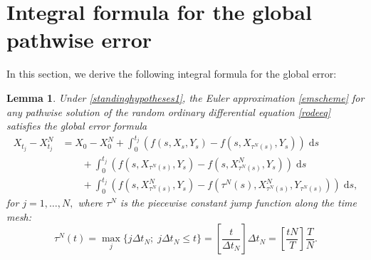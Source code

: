 \documentclass[reqno,12pt]{amsart}
\theoremstyle{plain} %
\newtheorem{lemma}{Lemma}[section]
\theoremstyle{definition} %
\begin{document}
\section{Integral formula for the global pathwise error}

In this section, we derive the following integral formula for the global error:
\begin{lemma}
    \label{lemglobalerrorintegralformula}
    Under \cref{standinghypotheses1}, the Euler approximation \eqref{emscheme} for any pathwise solution of the random ordinary differential equation \eqref{rodeeq} satisfies the global error formula
    \begin{equation}
        \label{globalerrorintegralformula}
        \begin{aligned}
            X_{t_j} - X_{t_j}^N & = X_0 - X_0^N + \int_0^{t_j} \left( f(s, X_s, Y_s) - f(s, X_{\tau^N(s)}, Y_s) \right)\;\mathrm{d}s  \\ 
            & \qquad + \int_{0}^{t_j} \left( f(s, X_{\tau^N(s)}, Y_s) - f(s, X_{\tau^N(s)}^N, Y_s) \right)\;\mathrm{d}s \\
            & \qquad + \int_0^{t_j} \left( f(s, X_{\tau^N(s)}^N, Y_s) - f(\tau^N(s), X_{\tau^N(s)}^N, Y_{\tau^N(s)}) \right)\;\mathrm{d}s,
        \end{aligned}
    \end{equation}
    for $j = 1, \ldots, N,$ where $\tau^N$ is the piecewise constant jump function along the time mesh:
    \begin{equation}
        \label{tauNt}
        \tau^N(t) = \max_j\{j\Delta t_N; \; j\Delta t_N \leq t\} = \left[\frac{t}{\Delta t_N}\right]\Delta t_N = \left[\frac{tN}{T}\right]\frac{T}{N}.
    \end{equation}
\end{lemma}
\end{document}
